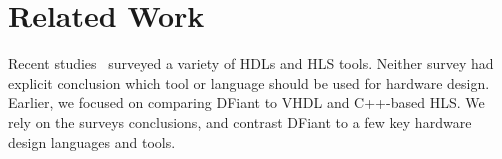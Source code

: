 \section{Related Work}
\label{sec:related_work}

Recent studies~\cite{Kapre2016, Nane2016, Windh2015} surveyed a variety of HDLs and HLS tools. Neither survey had explicit conclusion which tool or language should be used for hardware design. Earlier, we focused on comparing DFiant to VHDL and C++-based HLS. We rely on the surveys conclusions, and contrast DFiant to a few key hardware design languages and tools.





